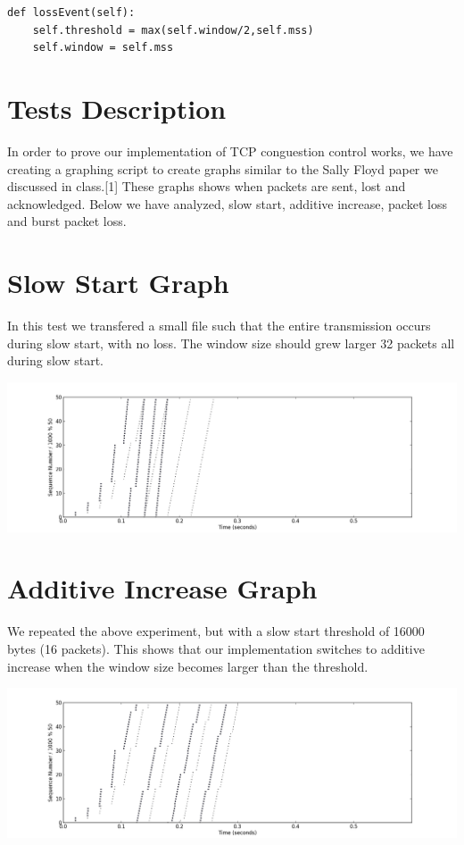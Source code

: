 \documentclass[11pt]{article}
\begin{document}
\begin{lstlisting}
def lossEvent(self):
    self.threshold = max(self.window/2,self.mss)
    self.window = self.mss
\end{lstlisting}

\section{Tests Description}
In order to prove our implementation of TCP conguestion control works, we have creating a graphing script to create graphs similar to the Sally Floyd paper we discussed in class.[1] These graphs shows when packets are sent, lost and acknowledged. Below we have analyzed, slow start, additive increase, packet loss and burst packet loss.

\section{Slow Start Graph}

In this test we transfered a small file such that the entire transmission occurs during slow start, with no loss. The window size should grew larger 32 packets all during slow start.

\centerline{\includegraphics[width=22cm]{slow_start.png}}

\section{Additive Increase Graph}

We repeated the above experiment, but with a slow start threshold of 16000 bytes (16 packets). This shows that our implementation switches to additive increase when the window size becomes larger than the threshold.

\centerline{\includegraphics[width=22cm]{additive_increase.png}}
\end{document}
